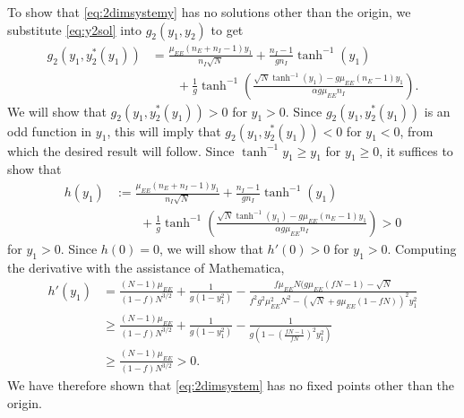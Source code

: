 \documentclass[reqno]{siamonline190516}
\begin{document}
To show that \cref{eq:2dimsystemy} has no solutions other than the origin, we substitute \cref{eq:y2sol} into $g_2(y_1, y_2)$ to get 
\begin{equation}
\begin{aligned}
g_2(y_1, y_2^*(y_1)) &= \frac{\mu_{EE}( n_E + n_I - 1) y_1 }{n_I \sqrt{N}} + \frac{n_I - 1}{g n_I} \tanh^{-1}(y_1) \\
&\qquad+ \frac{1}{g} \tanh^{-1} \left( \frac{ \sqrt{N} \tanh^{-1}(y_1) - g \mu_{EE}(n_E -1) y_1}{ \alpha g \mu_{EE} n_I } \right).
\end{aligned}
\end{equation}    
We will show that $g_2(y_1, y_2^*(y_1)) > 0$ for $y_1 > 0$. Since $g_2(y_1, y_2^*(y_1))$ is an odd function in $y_1$, this will imply that $g_2(y_1, y_2^*(y_1)) < 0$ for $y_1 < 0$, from which the desired result will follow. Since $\tanh^{-1}y_1 \geq y_1$ for $y_1 \geq 0$, it suffices to show that
\begin{equation}\label{eq:h}
\begin{aligned}
h(y_1) &:= \frac{\mu_{EE}( n_E + n_I - 1) y_1 }{n_I \sqrt{N}} + \frac{n_I - 1}{g n_I} \tanh^{-1}(y_1) \\
&\qquad+ \frac{1}{g} \tanh^{-1} \left( \frac{ \sqrt{N} \tanh^{-1}(y_1) - g \mu_{EE}(n_E -1) y_1}{ \alpha g \mu_{EE} n_I } \right) > 0
\end{aligned}
\end{equation}
for $y_1 > 0$. Since $h(0) = 0$, we will show that $h'(0) > 0$ for $y_1 > 0$. Computing the derivative with the assistance of Mathematica,
\begin{equation*}\label{eq:hprime}
\begin{aligned}
h'(y_1) &= 
\frac{(N-1)\mu_{EE}}{(1-f) N^{3/2} } + \frac{1}{g(1 - y_1^2)} 
- \frac{
 f \mu_{EE} N ( g \mu_{EE} ( f N - 1) - \sqrt{N}}{f^2 g^2 \mu_{EE}^2 N^2 - (\sqrt{N} + 
 g \mu_{EE}(1 - f N))^2 y_1^2} \\
 &\geq \frac{(N-1)\mu_{EE}}{(1-f) N^{3/2} } + \frac{1}{g(1 - y_1^2)} 
- \frac{1}{g \left( 1 - \left( \frac{ f N - 1}{f N} \right)^2 y_1^2 \right)} \\
&\geq \frac{(N-1)\mu_{EE}}{(1-f) N^{3/2} } > 0.
\end{aligned}
\end{equation*}
We have therefore shown that \cref{eq:2dimsystem} has no fixed points other than the origin.
\end{document}
